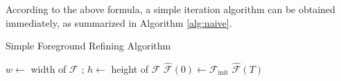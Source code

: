 \documentclass{article}
\theoremstyle{plain}
\begin{document}
According to the above formula, 
a simple iteration algorithm can be obtained immediately, as summarized in Algorithm \ref{alg:naive}.
\begin{algorithm}
\DontPrintSemicolon
    \SetAlgoNoLine
    \caption{Simple Foreground Refining Algorithm}
    \label{alg:naive}
     {
        $w \leftarrow$ width of $\mathcal F$
        ;
        $h \leftarrow$ height of $\mathcal F$
        \;
        $
        \hat{\mathcal F}(0) \leftarrow \mathcal F_{\mathrm{init}}$
        \;
        \Return $\hat{\mathcal F} (T)$\;
    }
\end{algorithm}
\end{document}
